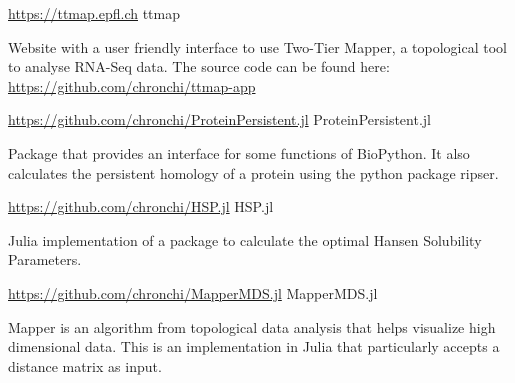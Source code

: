 

\begin{cventries}


\cventry
  {\url{https://ttmap.epfl.ch}} %
  {ttmap} %
  {}{}
  {
    \begin{cvitems} %
      \item {Website with a user friendly interface to use Two-Tier Mapper, a 
             topological tool to analyse RNA-Seq data. The source code can be
             found here: \url{https://github.com/chronchi/ttmap-app}}
    \end{cvitems}
  }



\cventry
  {\url{https://github.com/chronchi/ProteinPersistent.jl}} %
  {ProteinPersistent.jl} %
  {}{}
  {
    \begin{cvitems} %
      \item {Package that provides an interface for some functions of BioPython.
      It also calculates the persistent homology of a protein using the python
      package ripser.}
    \end{cvitems}
  }

\cventry
  {\url{https://github.com/chronchi/HSP.jl}} %
  {HSP.jl} %
  {}{}
  {
    \begin{cvitems} %
      \item {Julia implementation of a package to calculate the
      optimal Hansen Solubility Parameters.}
    \end{cvitems}
  }

\cventry
  {\url{https://github.com/chronchi/MapperMDS.jl}} %
  {MapperMDS.jl} %
  {}{}
  {
    \begin{cvitems} %
      \item {Mapper is an algorithm from topological data analysis that
      helps visualize high dimensional data. This is
      an implementation in Julia that particularly accepts a distance matrix
      as input.}
    \end{cvitems}
  }


\end{cventries}
